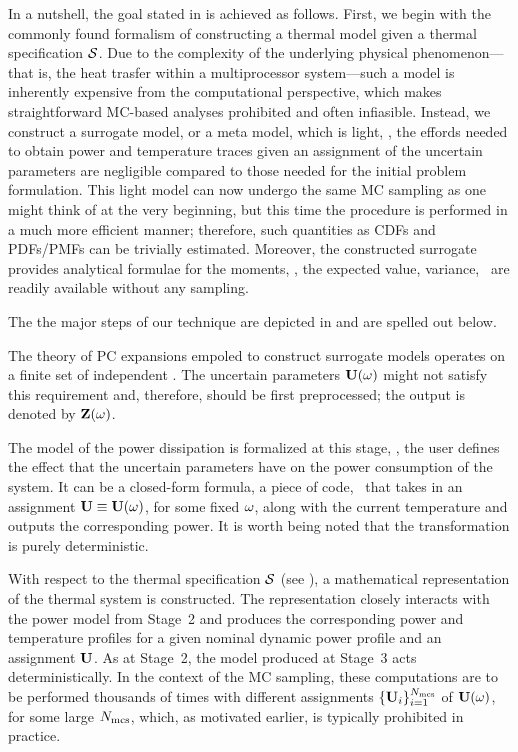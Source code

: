 
In a nutshell, the goal stated in  is achieved as follows. First, we begin with the commonly found formalism of constructing a thermal model given a thermal specification $\mathcal{S}$. Due to the complexity of the underlying physical phenomenon---that is, the heat trasfer within a multiprocessor system---such a model is inherently expensive from the computational perspective, which makes straightforward MC-based analyses prohibited and often infiasible. Instead, we construct a surrogate model, or a meta model, which is light, \ie, the effords needed to obtain power and temperature traces given an assignment of the uncertain parameters are negligible compared to those needed for the initial problem formulation. This light model can now undergo the same MC sampling as one might think of at the very beginning, but this time the procedure is performed in a much more efficient manner; therefore, such quantities as CDFs and PDFs/PMFs can be trivially estimated. Moreover, the constructed surrogate provides analytical formulae for the moments, \ie, the expected value, variance, \etc\ are readily available without any sampling.

The the major steps of our technique are depicted in  and are spelled out below.

 The theory of PC expansions empoled to construct surrogate models operates on a finite set of independent \rvs. The uncertain parameters $\mathbf{U}(\omega)$ might not satisfy this requirement and, therefore, should be first preprocessed; the output is denoted by $\mathbf{Z}(\omega)$.

 The model of the power dissipation is formalized at this stage, \ie, the user defines the effect that the uncertain parameters have on the power consumption of the system. It can be a closed-form formula, a piece of code, \etc\ that takes in an assignment $\mathbf{U} \equiv \mathbf{U}(\omega)$, for some fixed $\omega$, along with the current temperature and outputs the corresponding power. It is worth being noted that the transformation is purely deterministic.

 With respect to the thermal specification $\mathcal{S}$ (see ), a mathematical representation of the thermal system is constructed. The representation closely interacts with the power model from Stage~2 and produces the corresponding power and temperature profiles for a given nominal dynamic power profile and an assignment $\mathbf{U}$. As at Stage~2, the model produced at Stage~3 acts deterministically. In the context of the MC sampling, these computations are to be performed thousands of times with different assignments $\{ \mathbf{U}_i \}_{i = 1}^{N_\text{mcs}}$ of $\mathbf{U}(\omega)$, for some large $N_\text{mcs}$, which, as motivated earlier, is typically prohibited in practice.

